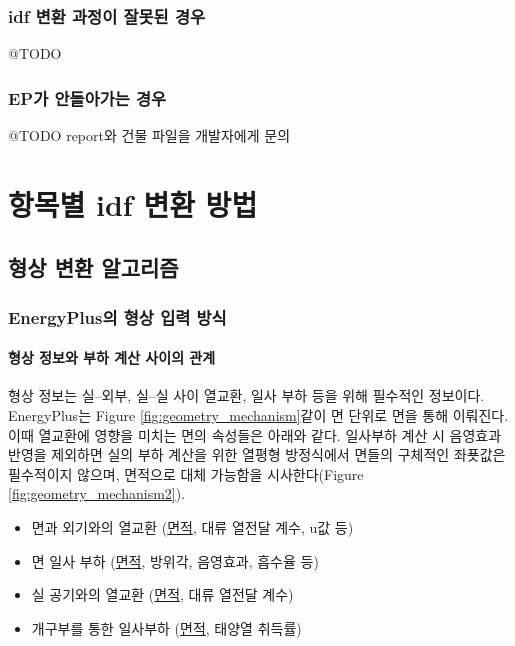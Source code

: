 \subsection{idf 변환 과정이 잘못된 경우}
@TODO

\subsection{EP가 안돌아가는 경우}
@TODO report와 건물 파일을 개발자에게 문의


\chapter{항목별 idf 변환 방법}
\label{chap:simulator_geometry}

\section{형상 변환 알고리즘}

\subsection{EnergyPlus의 형상 입력 방식}

\subsubsection{형상 정보와 부하 계산 사이의 관계}

형상 정보는 실--외부, 실--실 사이 열교환, 일사 부하 등을 위해 필수적인 정보이다. EnergyPlus는 Figure \ref{fig:geometry_mechanism}\과 같이 면 단위로  면을 통해 이뤄진다. 이때 열교환에 영향을 미치는 면의 속성들은 아래와 같다. 일사부하 계산 시 음영효과 반영을 제외하면 실의 부하 계산을 위한 열평형 방정식에서 면들의 구체적인 좌푯값은 필수적이지 않으며, 면적으로 대체 가능함을 시사한다(Figure \ref{fig:geometry_mechanism2}).

\begin{itemize}
  \item 면과 외기와의 열교환 (\underline{면적}, 대류 열전달 계수, u값 등)
  \item 면 일사 부하 (\underline{면적}, 방위각, 음영효과, 흡수율 등)
  \item 실 공기와의 열교환 (\underline{면적}, 대류 열전달 계수)
  \item 개구부를 통한 일사부하 (\underline{면적}, 태양열 취득률)
\end{itemize}

